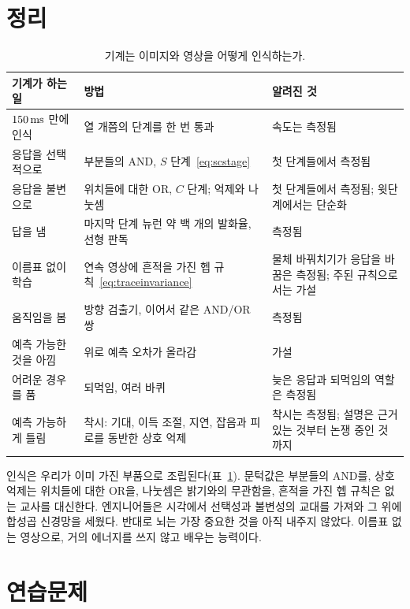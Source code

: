 \section{정리}

\begin{table}[t]
\centering
\footnotesize
\setlength{\tabcolsep}{4pt}
\renewcommand{\arraystretch}{1.15}
\begin{tabular}{>{\raggedright}p{3.0cm}>{\raggedright}p{4.6cm}>{\raggedright\arraybackslash}p{5.2cm}}
\toprule
기계가 하는 일 & 방법 & 알려진 것 \\
\midrule
$150\,\text{ms}$ 만에 인식 & 열 개쯤의 단계를 한 번 통과 & 속도는 측정됨 \\
응답을 선택적으로 & 부분들의 AND, $S$ 단계~\eqref{eq:scstage} & 첫 단계들에서 측정됨 \\
응답을 불변으로 & 위치들에 대한 OR, $C$ 단계; 억제와 나눗셈 & 첫 단계들에서 측정됨; 윗단계에서는 단순화 \\
답을 냄 & 마지막 단계 뉴런 약 백 개의 발화율, 선형 판독 & 측정됨 \\
이름표 없이 학습 & 연속 영상에 흔적을 가진 헵 규칙~\eqref{eq:traceinvariance} & 물체 바꿔치기가 응답을 바꿈은 측정됨; 주된 규칙으로서는 가설 \\
움직임을 봄 & 방향 검출기, 이어서 같은 AND/OR 쌍 & 측정됨 \\
예측 가능한 것을 아낌 & 위로 예측 오차가 올라감 & 가설 \\
어려운 경우를 품 & 되먹임, 여러 바퀴 & 늦은 응답과 되먹임의 역할은 측정됨 \\
예측 가능하게 틀림 & 착시: 기대, 이득 조절, 지연, 잡음과 피로를 동반한 상호 억제 & 착시는 측정됨; 설명은 근거 있는 것부터 논쟁 중인 것까지 \\
\bottomrule
\end{tabular}
\caption{기계는 이미지와 영상을 어떻게 인식하는가.}
\label{tab:recognition}
\end{table}

인식은 우리가 이미 가진 부품으로 조립된다(표~\ref{tab:recognition}). 문턱값은 부분들의 AND를, 상호 억제는 위치들에 대한 OR을, 나눗셈은 밝기와의 무관함을, 흔적을 가진 헵 규칙은 없는 교사를 대신한다. 엔지니어들은 시각에서 선택성과 불변성의 교대를 가져와 그 위에 합성곱 신경망을 세웠다. 반대로 뇌는 가장 중요한 것을 아직 내주지 않았다. 이름표 없는 영상으로, 거의 에너지를 쓰지 않고 배우는 능력이다.

\section{연습문제}

